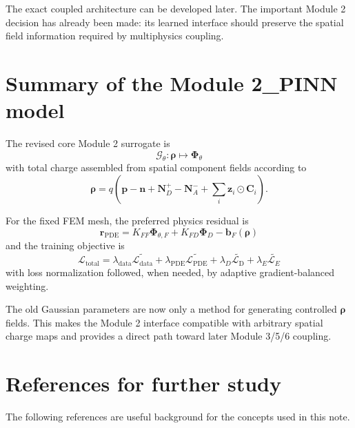 \documentclass[11pt]{article}
\newcommand{\Ldata}{\mathcal{L}_{\mathrm{data}}}
\newcommand{\Lpde}{\mathcal{L}_{\mathrm{PDE}}}
\newcommand{\Ldir}{\mathcal{L}_{\mathrm{D}}}
\newcommand{\LE}{\mathcal{L}_{E}}
\newcommand{\Ltot}{\mathcal{L}_{\mathrm{total}}}
\begin{document}
The exact coupled architecture can be developed later. The important Module 2 decision has already been made: its learned interface should preserve the spatial field information required by multiphysics coupling.

\section{Summary of the Module 2\_PINN model}

The revised core Module 2 surrogate is
\begin{equation}
\boxed{
\mathcal{G}_{\theta}:\bm{\rho}\mapsto\bm{\Phi}_{\theta}
}
\end{equation}
with total charge assembled from spatial component fields according to
\begin{equation}
\bm{\rho}=q\left(\bm{p}-\bm{n}+\bm{N}_D^+-\bm{N}_A^-+\sum_i\bm{z}_i\odot\bm{C}_i\right).
\end{equation}

For the fixed FEM mesh, the preferred physics residual is
\begin{equation}
\boxed{
\bm{r}_{\mathrm{PDE}}
=K_{FF}\bm{\Phi}_{\theta,F}+K_{FD}\bm{\Phi}_D-\bm{b}_F(\bm{\rho})
}
\end{equation}
and the training objective is
\begin{equation}
\boxed{
\Ltot
=\lambda_{\mathrm{data}}\widetilde{\Ldata}
+\lambda_{\mathrm{PDE}}\widetilde{\Lpde}
+\lambda_{D}\widetilde{\Ldir}
+\lambda_E\widetilde{\LE}
}
\end{equation}
with loss normalization followed, when needed, by adaptive gradient-balanced weighting.

The old Gaussian parameters are now only a method for generating controlled $\bm{\rho}$ fields. This makes the Module 2 interface compatible with arbitrary spatial charge maps and provides a direct path toward later Module 3/5/6 coupling.

\section{References for further study}

The following references are useful background for the concepts used in this note.
\end{document}
